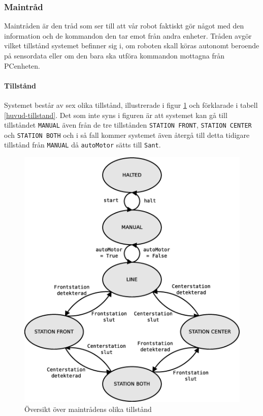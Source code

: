 \subsubsection{Maintråd}
Maintråden är den tråd som ser till att vår robot faktiskt gör något med den information och de kommandon den tar emot från andra enheter. Tråden avgör vilket tillstånd systemet befinner sig i, om roboten skall köras autonomt beroende på sensordata eller om den bara ska utföra kommandon mottagna från PCenheten.

\paragraph{Tillstånd}

Systemet består av sex olika tillstånd, illustrerade i figur \ref{huvud-tillstand-diagram} och förklarade i tabell \ref{huvud-tillstand}. Det som inte syns i figuren är att systemet kan gå till tillståndet \texttt{MANUAL} även från de tre tillstånden \texttt{STATION FRONT}, \texttt{STATION CENTER} och \texttt{STATION BOTH} och i så fall kommer systemet även återgå till detta tidigare tillstånd från \texttt{MANUAL} då \texttt{autoMotor} sätts till \texttt{Sant}.

\begin{figure}[h!]
	\centering
	\includegraphics[scale=0.4]{grafik/huvud-tillstand}
	\caption{Översikt över maintrådens olika tillstånd} \label{huvud-tillstand-diagram}
\end{figure}

